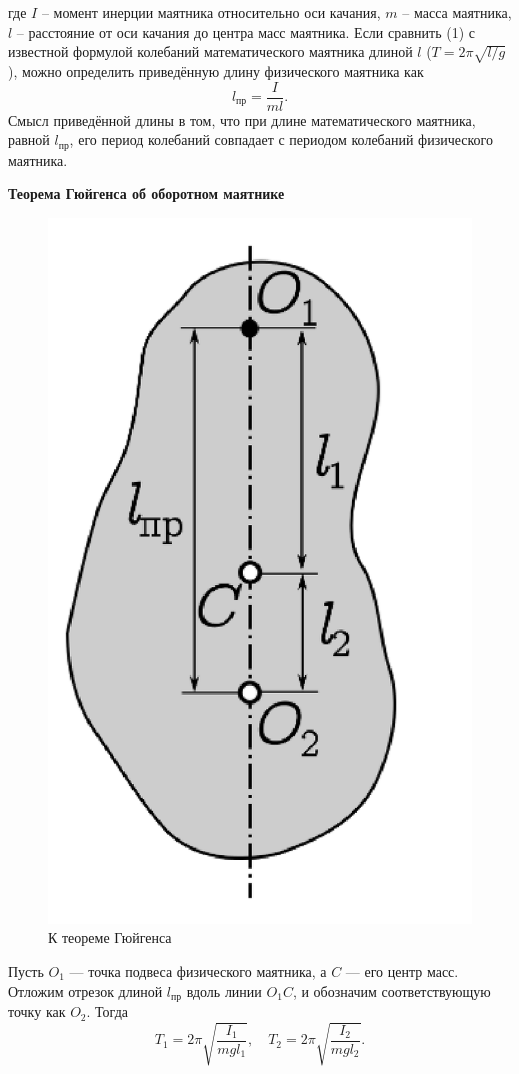 \documentclass[a4paper,12 pt]{article}
\begin{document}
где $I$ -- момент инерции маятника относительно оси качания, $m$ -- масса
маятника, $l$ -- расстояние от оси качания до центра масс маятника.
Если сравнить (1) с известной формулой колебаний математического
маятника длиной $l$ ($T = 2\pi \sqrt{l / g}$), можно определить приведённую длину
физического маятника как
\begin{equation}
    l_{\text{пр}} = \frac{I}{ml}.
\end{equation}
Смысл приведённой длины в том, что при длине математического маятника, равной $l_{\text{пр}}$, его период колебаний совпадает с периодом колебаний
физического маятника.

\textbf{Теорема Гюйгенса об оборотном маятнике}
\begin{figure}[H]
    \centering
    \includegraphics[scale = 0.3]{гюйгенс.png}
    \caption{К теореме Гюйгенса}
\end{figure}
Пусть $O_1$ — точка подвеса физического маятника, а
$C$ — его центр масс. Отложим отрезок длиной $l_{\text{пр}}$ вдоль
линии $O_1 C$, и обозначим соответствующую точку как $O_2$. Тогда
\begin{equation}
    T_1 = 2\pi \sqrt{\frac{I_1}{mgl_1}}, \quad T_2 = 2\pi \sqrt{\frac{I_2}{mgl_2}}.
\end{equation}
\end{document}
